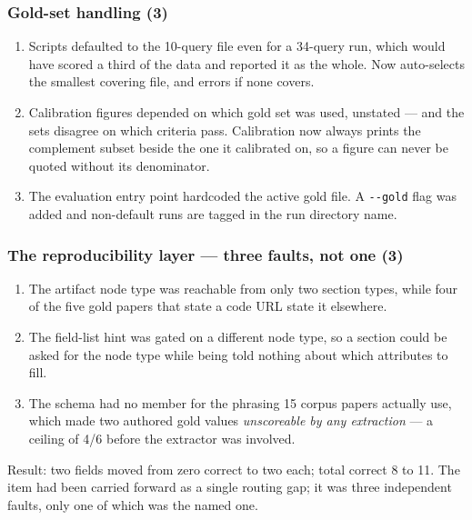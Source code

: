 \subsubsection*{Gold-set handling (3)}

\begin{enumerate}[label=B\arabic*.]
  \item Scripts defaulted to the 10-query file even for a 34-query run, which
        would have scored a third of the data and reported it as the whole. Now
        auto-selects the smallest covering file, and errors if none covers.
  \item Calibration figures depended on which gold set was used, unstated --- and
        the sets disagree on which criteria pass. Calibration now always prints
        the complement subset beside the one it calibrated on, so a figure can
        never be quoted without its denominator.
  \item The evaluation entry point hardcoded the active gold file. A
        \texttt{-{}-gold} flag was added and non-default runs are tagged in the
        run directory name.
\end{enumerate}

\subsubsection*{The reproducibility layer --- three faults, not one (3)}

\begin{enumerate}[label=C\arabic*.]
  \item The artifact node type was reachable from only two section types, while
        four of the five gold papers that state a code URL state it elsewhere.
  \item The field-list hint was gated on a different node type, so a section
        could be asked for the node type while being told nothing about which
        attributes to fill.
  \item The schema had no member for the phrasing 15 corpus papers actually
        use, which made two authored gold values \emph{unscoreable by any
        extraction} --- a ceiling of 4/6 before the extractor was involved.
\end{enumerate}

Result: two fields moved from zero correct to two each; total correct 8 to 11.
The item had been carried forward as a single routing gap; it was three
independent faults, only one of which was the named one.

